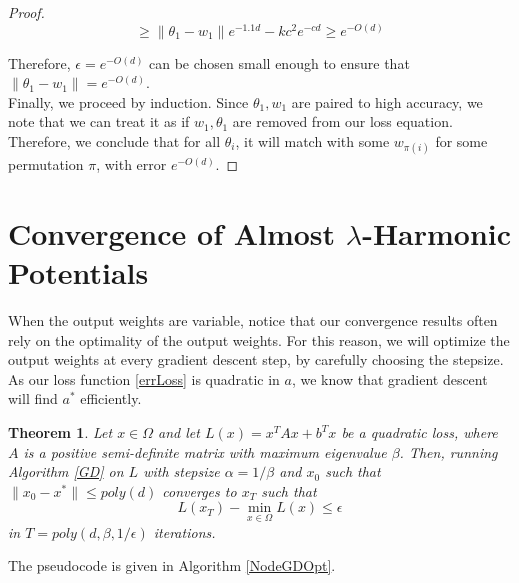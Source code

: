 \documentclass{article}
\newtheorem{theorem}{Theorem}[section]
\begin{document}
\begin{proof}
\[\geq \|\theta_1-w_1\|e^{-1.1d} - kc^2e^{-cd} \geq e^{-O(d)}\]

Therefore, $\epsilon = e^{-O(d)}$ can be chosen small enough to ensure that $\|\theta_1 - w_1\| = e^{-O(d)}$. \\

Finally, we proceed by induction. Since $\theta_1, w_1$ are paired to high accuracy, we note that we can treat it as if $w_1, \theta_1$ are removed from our loss equation. Therefore, we conclude that for all $\theta_i$, it will match with some $w_{\pi(i)}$ for some permutation $\pi$, with error $e^{-O(d)}$. 

\end{proof}




\section{Convergence of Almost $\lambda$-Harmonic Potentials}\label{App:EigenFunc}

When the output weights are variable, notice that our convergence results often rely on the optimality of the output weights. For this reason, we will optimize the output weights at every gradient descent step, by carefully choosing the stepsize. As our loss function \eqref{errLoss} is quadratic in $a$, we know that gradient descent will find $a^*$ efficiently. 


\begin{theorem}\label{quadConverge}
Let $x \in \Omega$ and let $L(x) = x^TAx + b^Tx$ be a quadratic loss, where $A$ is a positive semi-definite matrix with maximum eigenvalue $\beta$. Then, running Algorithm \ref{GD} on $L$ with stepsize $\alpha = 1/\beta$ and $x_0$ such that $\|x_0 -x^*\| \leq poly(d)$ converges to $x_T$ such that \[L(x_T) - \min_{x \in \Omega} L(x) \leq \epsilon\] in $T = poly(d, \beta, 1/\epsilon)$ iterations. 
\end{theorem}

The pseudocode is given in Algorithm \ref{NodeGDOpt}. 
\end{document}
